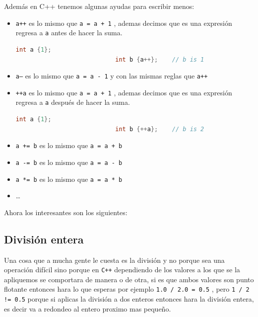 \documentclass[12pt, fleqn]{report}                             %
\theoremstyle{break}                                            %
\newcommand{\textCode}[1]  { \texttt{#1} }                      %
\newcommand \Cpp  {\textCode{C++} }                               %
\begin{document}
                Además en C++ tenemos algunas ayudas para escribir menos:
                \begin{itemize}
                    \item \textCode{a++} es lo mismo que \textCode{a = a + 1}, ademas 
                        decimos que es una expresión regresa a \textCode{a} antes de hacer la suma.
                        \begin{lstlisting}[language=C++, gobble=28]
                            int a {1};
                            int b {a++};    // b is 1
                        \end{lstlisting}
                    \item \textCode{a--} es lo mismo que \textCode{a = a - 1} y con las mismas reglas que \textCode{a++}
                    \item \textCode{++a} es lo mismo que \textCode{a = a + 1}, ademas 
                        decimos que es una expresión regresa a \textCode{a} después de hacer la suma.
                        \begin{lstlisting}[language=C++, gobble=28]
                            int a {1};
                            int b {++a};    // b is 2
                        \end{lstlisting}
                    \item \textCode{a += b} es lo mismo que \textCode{a = a + b}
                    \item \textCode{a -= b} es lo mismo que \textCode{a = a - b}
                    \item \textCode{a *= b} es lo mismo que \textCode{a = a * b}
                    \item \dots
                \end{itemize}

                Ahora los interesantes son los siguientes:

            \subsection{División entera}

                Una cosa que a mucha gente le cuesta es la división y no porque
                sea una operación difícil sino porque en \Cpp dependiendo de los
                valores a los que se la apliquemos se comportara de manera o de otra,
                si es que ambos valores son punto flotante entonces hara lo que esperas
                por ejemplo \textCode{1.0 / 2.0 = 0.5}, pero \textCode{1 / 2 != 0.5} porque
                si aplicas la división a dos enteros entonces hara la división entera, es decir
                va a redondeo al entero proximo mas pequeño.
\end{document}
